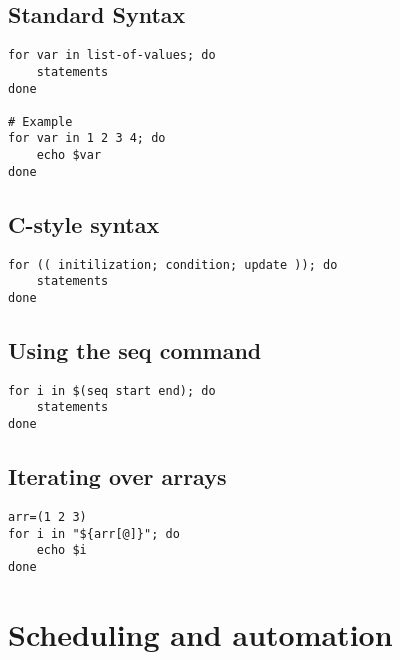 \documentclass{report}
\begin{document}
    \subsection{Standard Syntax}
    \smallbreak \noindent
    
    \begin{verbatim}
for var in list-of-values; do
    statements
done

# Example
for var in 1 2 3 4; do
    echo $var
done
    \end{verbatim}
    \bigbreak \noindent
    

    \bigbreak \noindent 
    \subsection{C-style syntax}
    \smallbreak \noindent
    
    \begin{verbatim}
for (( initilization; condition; update )); do 
    statements
done
    \end{verbatim}
    \bigbreak \noindent
    
    \bigbreak \noindent 
    \subsection{Using the seq command}
    \smallbreak \noindent
    
    \begin{verbatim}
for i in $(seq start end); do
    statements
done
    \end{verbatim}
    \bigbreak \noindent
    

    \bigbreak \noindent 
    \subsection{Iterating over arrays}
    \smallbreak \noindent
    
    \begin{verbatim}
arr=(1 2 3)
for i in "${arr[@]}"; do
    echo $i
done
    \end{verbatim}
    \bigbreak \noindent
    

    \pagebreak \bigbreak \noindent 
    \section{\LARGE Scheduling and automation}
    \bigbreak \noindent 
\end{document}
